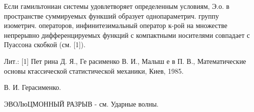 \documentclass[10pt]{article}
\begin{document}
Если гамильтониан системы удовлетворяет определенным условиям, Э.о. в пространстве суммируемых функший образует однопараметрич. группу изометрич. операторов, инфинитезимальный оператор к-рой на множестве непрерывно дифференцируемых функций с компактными носителями совпадает с Пуассона скобкой (см. [1]).



Лит.: [1] Пет рина Д. Я., Ге расименко В. И., Малыш е в П. В., Математические основы ктассической статистической механики, Киев, 1985.



В. И. Герасименко.



ЭВОЛюЦМОННЫЙ РАЗРЫВ - см. Ударные волны.
\end{document}

